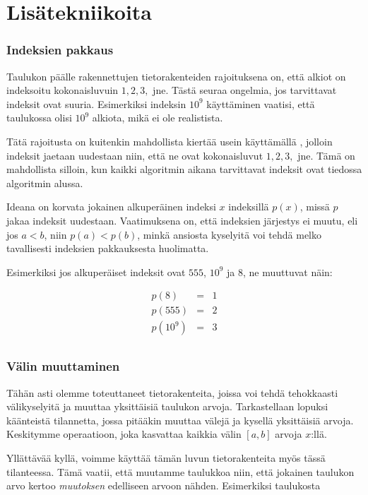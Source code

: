 \section{Lisätekniikoita}

\subsubsection{Indeksien pakkaus}

Taulukon päälle rakennettujen tietorakenteiden
rajoituksena on, että alkiot on indeksoitu
kokonaisluvuin $1,2,3,$ jne.
Tästä seuraa ongelmia,
jos tarvittavat indeksit ovat suuria.
Esimerkiksi indeksin $10^9$ käyttäminen
vaatisi, että taulukossa olisi $10^9$ alkiota,
mikä ei ole realistista.


Tätä rajoitusta on kuitenkin mahdollista
kiertää usein käyttämällä ,
jolloin indeksit jaetaan
uudestaan niin, että ne ovat
kokonaisluvut $1,2,3,$ jne.
Tämä on mahdollista silloin, kun kaikki
algoritmin aikana tarvittavat indeksit
ovat tiedossa algoritmin alussa.

Ideana on korvata jokainen alkuperäinen
indeksi $x$ indeksillä $p(x)$,
missä $p$ jakaa indeksit uudestaan.
Vaatimuksena on, että indeksien järjestys
ei muutu, eli jos $a<b$, niin $p(a)<p(b)$,
minkä ansiosta kyselyitä voi tehdä
melko tavallisesti indeksien pakkauksesta huolimatta.

Esimerkiksi jos alkuperäiset indeksit ovat
$555$, $10^9$ ja $8$, ne muuttuvat näin:

\[
\begin{array}{lcl}
p(8) & = & 1 \\
p(555) & = & 2 \\
p(10^9) & = & 3 \\
\end{array}
\]

\subsubsection{Välin muuttaminen}

Tähän asti olemme toteuttaneet tietorakenteita,
joissa voi tehdä tehokkaasti välikyselyitä
ja muuttaa yksittäisiä taulukon arvoja.
Tarkastellaan lopuksi käänteistä tilannetta,
jossa pitääkin muuttaa välejä ja 
kysellä yksittäisiä arvoja.
Keskitymme operaatioon,
joka kasvattaa kaikkia välin $[a,b]$ arvoja $x$:llä.

Yllättävää kyllä,
voimme käyttää tämän luvun tietorakenteita myös tässä tilanteessa.
Tämä vaatii, että muutamme taulukkoa niin,
että jokainen taulukon arvo kertoo \textit{muutoksen}
edelliseen arvoon nähden.
Esimerkiksi taulukosta

